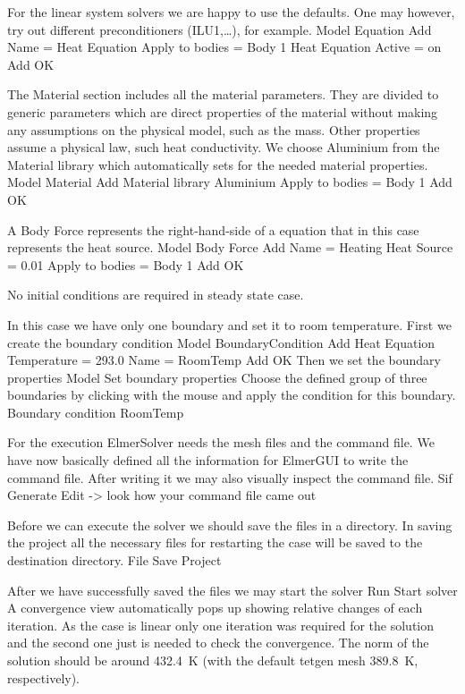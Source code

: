 For the linear system solvers we are happy to use the defaults. One may however, try out different
preconditioners (ILU1,\ldots), for example.
\ttbegin
Model
  Equation
    Add 
      Name = Heat Equation
      Apply to bodies = Body 1
      Heat Equation
        Active = on
      Add   
      OK
\ttend        

The Material section includes all the material parameters.
They are divided to generic parameters which are direct properties of the material
without making any assumptions on the physical model, such as the mass. Other properties assume
a physical law, such heat conductivity.
We choose Aluminium from the Material library which automatically sets for the needed material properties. 
\ttbegin
Model
  Material
    Add 
      Material library
        Aluminium
      Apply to bodies = Body 1 
      Add 
      OK
\ttend

A Body Force represents the right-hand-side of a equation that in this case represents
the heat source. 
\ttbegin
Model
  Body Force
    Add 
      Name = Heating
      Heat Source = 0.01
      Apply to bodies = Body 1
      Add
      OK
\ttend    

No initial conditions are required in steady state case.

In this case we have only one boundary and set it to room temperature.
First we create the boundary condition
\ttbegin
Model
  BoundaryCondition
    Add 
      Heat Equation
        Temperature = 293.0
      Name = RoomTemp
      Add
      OK
\ttend   
Then we set the boundary properties 
\ttbegin
Model 
  Set boundary properties  
\ttend
Choose the defined group of three boundaries by clicking with the mouse
and apply the condition for this boundary.
\ttbegin
Boundary condition
  RoomTemp
\ttend

For the execution 
ElmerSolver needs the mesh files and the command file. We have now basically defined
all the information for ElmerGUI to write the command file. After writing it we may also visually 
inspect the command file.
\ttbegin
Sif 
  Generate
  Edit -> look how your command file came out  
\ttend

Before we can execute the solver we should save the files in a directory. In saving the project all the
necessary files for restarting the case will be saved to the 
destination directory.
\ttbegin
File 
  Save Project
\ttend

After we have successfully saved the files we may start the solver
\ttbegin
Run
  Start solver
\ttend
A convergence view automatically pops up showing relative changes of each iteration.
As the case is linear only one iteration was required for the solution and the second one
just is needed to check the convergence. The norm of the solution
should be around 432.4~K (with the default tetgen mesh 389.8~K, respectively).

